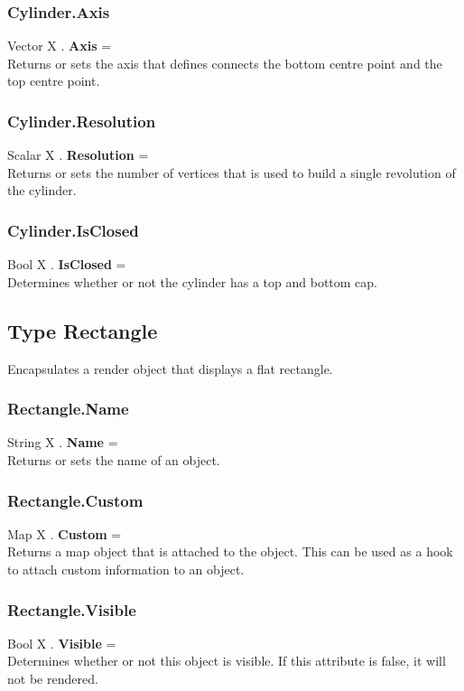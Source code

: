 \subsubsection{Cylinder.Axis \label{F:Cylinder:Axis}}
Vector X . \textbf{Axis} = \\
Returns or sets the axis that defines connects the bottom centre point and the top centre point.

\subsubsection{Cylinder.Resolution \label{F:Cylinder:Resolution}}
Scalar X . \textbf{Resolution} = \\
Returns or sets the number of vertices that is used to build a single revolution of the cylinder.

\subsubsection{Cylinder.IsClosed \label{F:Cylinder:IsClosed}}
Bool X . \textbf{IsClosed} = \\
Determines whether or not the cylinder has a top and bottom cap.

\subsection{Type Rectangle \label{T:Rectangle}}
Encapsulates a render object that displays a flat rectangle.

\subsubsection{Rectangle.Name \label{F:Rectangle:Name}}
String X . \textbf{Name} = \\
Returns or sets the name of an object.

\subsubsection{Rectangle.Custom \label{F:Rectangle:Custom}}
Map X . \textbf{Custom} = \\
Returns a map object that is attached to the object. This can be used as a hook to attach custom information to an object.


\subsubsection{Rectangle.Visible \label{F:Rectangle:Visible}}
Bool X . \textbf{Visible} = \\
Determines whether or not this object is visible. If this attribute is false, it will not be rendered.

